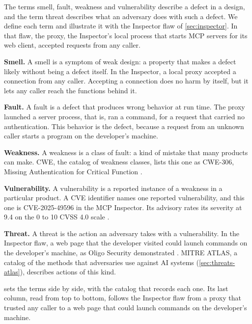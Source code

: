 The terms smell, fault, weakness and vulnerability describe a defect in a design, and the term
threat describes what an adversary does with such a defect. We define each term and illustrate it
with the Inspector flaw of \cref{sec:inspector}. In that flaw, the proxy, the Inspector's local
process that starts MCP servers for its web client, accepted requests from any caller.
\bi
\item \textbf{Smell.} A smell is a symptom of weak design: a property that makes a defect likely
without being a defect itself. In the Inspector, a local proxy accepted a connection from any
caller. Accepting a connection does no harm by itself, but it lets any caller reach the functions
behind it.
\item \textbf{Fault.} A fault is a defect that produces wrong behavior at run time. The proxy
launched a server process, that is, ran a command, for a request that carried no authentication.
This behavior is the defect, because a request from an unknown caller starts a program on the
developer's machine.
\item \textbf{Weakness.} A weakness is a class of fault: a kind of mistake that many products can
make. CWE, the catalog of weakness classes, lists this one as CWE-306, Missing Authentication for
Critical Function \citep{cwe-306}.
\item \textbf{Vulnerability.} A vulnerability is a reported instance of a weakness in a particular
product. A CVE identifier names one reported vulnerability, and this one is CVE-2025-49596 in the
MCP Inspector. Its advisory rates its severity at 9.4 on the 0 to 10 CVSS 4.0 scale
\citep{ghsa-7f8r-inspector}.
\item \textbf{Threat.} A threat is the action an adversary takes with a vulnerability. In the
Inspector flaw, a web page that the developer visited could launch commands on the developer's
machine, as Oligo Security demonstrated \citep{lumelsky2025inspector}. MITRE ATLAS, a catalog of the
methods that adversaries use against AI systems (\cref{sec:threats-atlas}), describes actions of
this kind.
\ei

 sets the terms side by side, with the catalog that records each one. Its
last column, read from top to bottom, follows the Inspector flaw from a proxy that trusted any
caller to a web page that could launch commands on the developer's machine.


